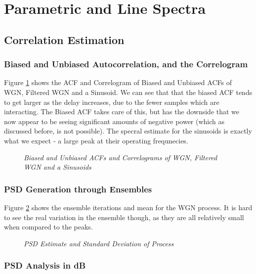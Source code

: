 \documentclass[./main.tex]{subfiles}
\begin{document}
\section{Parametric and Line Spectra}

\subsection{Correlation Estimation}

\subsubsection{Biased and Unbiased Autocorrelation, and the Correlogram}

Figure \ref{fig:2_1_a} shows the ACF and Correlogram of Biased and Unbiased ACFs of WGN, Filtered WGN and a Sinusoid. We can see that that the biased ACF tends to get larger as the delay increases, due to the fewer samples which are interacting. The Biased ACF takes care of this, but has the downside that we now appear to be seeing significant amounts of negative power (which as discussed before, is not possible). The specral estimate for the sinusoids is exactly what we expect - a large peak at their operating frequnecies.

\begin{figure}[h]
	\centering 
	\resizebox{\textwidth}{!}{}
	\caption{\textit{Biased and Unbiased ACFs and Correlograms of WGN, Filtered WGN and a Sinusoids}}
	\label{fig:2_1_a}
\end{figure}


\subsubsection{PSD Generation through Ensembles}

Figure \ref{fig:2_1_b} shows the ensemble iterations and mean for the WGN process. It is hard to see the real variation in the ensemble though, as they are all relatively small when compared to the peaks.

\begin{figure}[h]
	\centering 
	\resizebox{\textwidth}{!}{}
	\caption{\textit{PSD Estimate and Standard Deviation of Process}}
	\label{fig:2_1_b}
\end{figure}

\subsubsection{PSD Analysis in dB}
\end{document}
